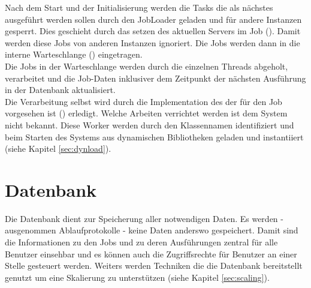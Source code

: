 Nach dem Start und der Initialisierung werden die Tasks die als nächstes ausgeführt werden sollen durch den JobLoader geladen und für andere Instanzen gesperrt. Dies geschieht durch das setzen des aktuellen Servers im Job (). Damit werden diese Jobs von anderen Instanzen ignoriert. Die Jobs werden dann in die interne Warteschlange () eingetragen.
\\Die Jobs in der Warteschlange werden durch die einzelnen Threads abgeholt, verarbeitet und die Job-Daten inklusiver dem Zeitpunkt der nächsten Ausführung in der Datenbank aktualisiert.
\\Die Verarbeitung selbst wird durch die Implementation des  der für den Job vorgesehen ist () erledigt. Welche Arbeiten verrichtet werden ist dem System nicht bekannt. Diese Worker werden durch den Klassennamen identifiziert und beim Starten des Systems aus dynamischen Bibliotheken geladen und instantiiert (siehe Kapitel \ref{sec:dynload}).

\section{Datenbank}
Die Datenbank dient zur Speicherung aller notwendigen Daten. Es werden - ausgenommen Ablaufprotokolle - keine Daten anderswo gespeichert. Damit sind die Informationen zu den Jobs und zu deren Ausführungen zentral für alle Benutzer einsehbar und es können auch die Zugriffsrechte für Benutzer an einer Stelle gesteuert werden. Weiters werden Techniken die die Datenbank bereitstellt genutzt um eine Skalierung zu unterstützen (siehe Kapitel \ref{sec:scaling}).
